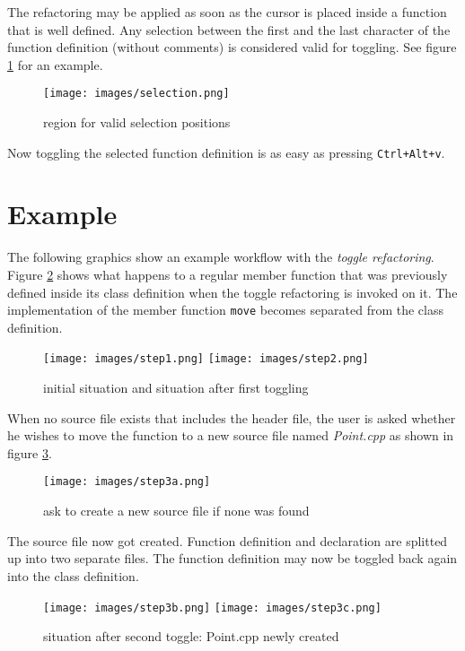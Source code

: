The refactoring may be applied as soon as the cursor is placed inside a function 
that is well defined. Any selection between the first and the last character of 
the function definition (without comments) is considered valid for toggling. See 
figure \ref{selection} for an example.
\begin{figure}[h]
\centering
\texttt{[image: images/selection.png]}
\caption{region for valid selection positions}
\label{selection}
\end{figure}

Now toggling the selected function definition is as easy as pressing 
\texttt{Ctrl+Alt+v}.

\section{Example}

The following graphics show an example workflow with the \textit{toggle 
refactoring}. Figure \ref{exampleA} shows what happens to a regular member 
function that was previously defined inside its class definition when the toggle 
refactoring is invoked on it. The implementation of the member function 
\texttt{move} becomes separated from the class definition.

\begin{figure}[h]
\texttt{[image: images/step1.png]}
\texttt{[image: images/step2.png]}
\caption{initial situation and situation after first toggling}
\label{exampleA}
\end{figure}

When no source file exists that includes the header file, the user is asked 
whether he wishes to move the function to a new source file named 
\textit{Point.cpp} as shown in figure \ref{exampleB}.

\begin{figure}[h]
\texttt{[image: images/step3a.png]}
\caption{ask to create a new source file if none was found}
\label{exampleB}
\end{figure}

The source file now got created. Function definition and declaration are 
splitted up into two separate files. The function definition may now be toggled 
back again into the class definition.

\begin{figure}[h]
\texttt{[image: images/step3b.png]}
\texttt{[image: images/step3c.png]}
\caption{situation after second toggle: Point.cpp newly created}
\label{exampleC}
\end{figure}

